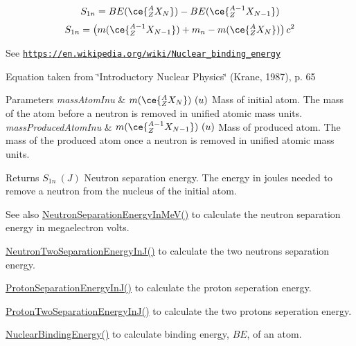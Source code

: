 \[S_{1n} = BE(\ce{ ^{A}_{Z}X_{N} }) - BE(\ce{ ^{A-1}_{Z}X_{N-1} })\] \[S_{1n} = \left ( m(\ce{ ^{A-1}_{Z}X_{N-1} }) + m_n - m(\ce{ ^{A}_{Z}X_{N} }) \right ) c^2\]

See \href{https://en.wikipedia.org/wiki/Nuclear_binding_energy}{\tt https\+://en.\+wikipedia.\+org/wiki/\+Nuclear\+\_\+binding\+\_\+energy}

Equation taken from \char`\"{}\+Introductory Nuclear Physics\char`\"{} (Krane, 1987), p. 65


\begin{DoxyParams}{Parameters}
{\em mass\+Atom\+Inu} & $m(\ce{ ^{A}_{Z}X_{N} })\ (u)$ Mass of initial atom. The mass of the atom before a neutron is removed in unified atomic mass units. \\
\hline
{\em mass\+Produced\+Atom\+Inu} & $m(\ce{ ^{A-1}_{Z}X_{N-1} })\ (u)$ Mass of produced atom. The mass of the produced atom once a neutron is removed in unified atomic mass units. \\
\hline
\end{DoxyParams}
\begin{DoxyReturn}{Returns}
$S_{1n}\ (J)$ Neutron separation energy. The energy in joules needed to remove a neutron from the nucleus of the initial atom. 
\end{DoxyReturn}
\begin{DoxySeeAlso}{See also}
\hyperlink{group___e_g_x_phys-_nuclear_separation_energy_ga66133edb5809c81dd9fd60e09ebbef79}{Neutron\+Separation\+Energy\+In\+Me\+V()} to calculate the neutron separation energy in megaelectron volts. 

\hyperlink{group___e_g_x_phys-_nuclear_separation_energy_ga293ac9428420a0adf4235048dbe529b4}{Neutron\+Two\+Separation\+Energy\+In\+J()} to calculate the two neutrons separation energy. 

\hyperlink{group___e_g_x_phys-_nuclear_separation_energy_ga4274d8f5a3860169fd81970707eb582a}{Proton\+Separation\+Energy\+In\+J()} to calculate the proton seperation energy. 

\hyperlink{group___e_g_x_phys-_nuclear_separation_energy_gad7c1d4a32daa8aaa53c5fce37c421f82}{Proton\+Two\+Separation\+Energy\+In\+J()} to calculate the two protons seperation energy. 

\hyperlink{group___e_g_x_phys-_nuclear_binding_energy_gafea41a3c21704414394c3204b35aba98}{Nuclear\+Binding\+Energy()} to calculate binding energy, $BE$, of an atom. 
\end{DoxySeeAlso}
\mbox{\label{group___e_g_x_phys-_nuclear_separation_energy_ga66133edb5809c81dd9fd60e09ebbef79}} 
